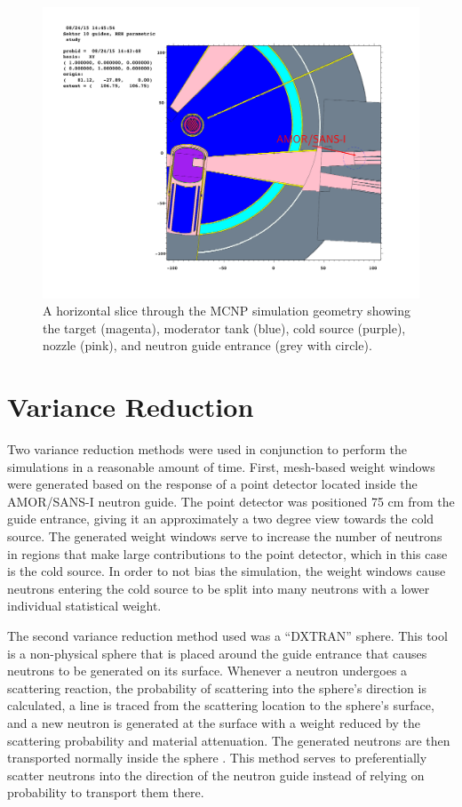 \documentclass[a4paper]{jpconf}
\begin{document}
\begin{figure}
\begin{center}
\includegraphics[trim={9.2cm 8cm 4cm 8cm},clip]{graphics/geom2.pdf}
\end{center}
\caption{\label{geom}A horizontal slice through the MCNP simulation geometry showing the target (magenta), moderator tank (blue), cold source (purple), nozzle (pink), and neutron guide entrance (grey with circle).}
\end{figure}

\section{Variance Reduction}

Two variance reduction methods were used in conjunction to perform the simulations in a reasonable amount of time.  First, mesh-based weight windows were generated based on the response of a point detector located inside the AMOR/SANS-I neutron guide.  The point detector was positioned 75 cm from the guide entrance, giving it an approximately a two degree view towards the cold source.  The generated weight windows serve to increase the number of neutrons in regions that make large contributions to the point detector, which in this case is the cold source. In order to not bias the simulation, the weight windows cause neutrons entering the cold source to be split into many neutrons with a lower individual statistical weight.  

The second variance reduction method used was a ``DXTRAN'' sphere.  This tool is a non-physical sphere that is placed around the guide entrance that causes neutrons to be generated on its surface.  Whenever a neutron undergoes a scattering reaction, the probability of scattering into the sphere's direction is calculated, a line is traced from the scattering location to the sphere's surface, and a new neutron is generated at the surface with a weight reduced by the scattering probability and material attenuation.  The generated neutrons are then transported normally inside the sphere \cite{mcnp5,mcnp6}.  This method serves to preferentially scatter neutrons into the direction of the neutron guide instead of relying on probability to transport them there.
\end{document}
